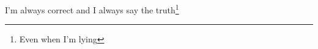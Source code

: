 \documentclass[a4paper]{article}
\begin{document}

I'm always correct and I always say the truth\footnote{Even when I'm lying}
\end{document}
